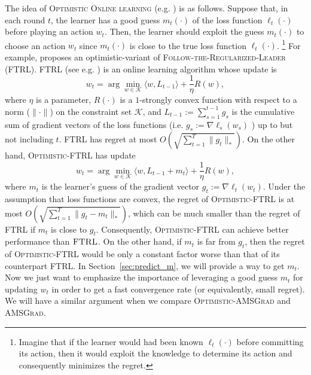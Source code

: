 \documentclass[11pt]{article}
\def\K{\mathcal{K}}
\theoremstyle{k}
\begin{document}
The idea of \textsc{Optimistic Online learning} (e.g. \cite{CJ12,RS13,SALS15,ALLW18})
is as follows.
Suppose that, in each round $t$, the learner has a good guess $m_t(\cdot)$ of the loss function $\ell_t(\cdot)$ before playing an action $w_t$. 
Then, the learner should exploit the guess $m_t(\cdot)$ to choose an action $w_t$ since $m_t(\cdot)$ is close to the true loss function $\ell_t(\cdot)$.
\footnote{Imagine that if the learner would had been known $\ell_t(\cdot)$ before committing its action, then it would exploit the knowledge to determine its action and consequently minimizes the regret.} For example, \cite{SALS15} proposes an optimistic-variant of \textsc{Follow-the-Regularized-Leader} (\textsc{FTRL}).
\textsc{FTRL} (see e.g. \cite{H14}) is an online learning algorithm whose update is
\begin{equation} \label{optFTRL}
\textstyle w_t  = \arg \min_{w \in \K} \langle w , L_{t-1} \rangle + \frac{1}{\eta} R(w),
\end{equation}
where $\eta$ is a parameter, $R(\cdot)$ is a $1$-strongly convex function with respect to a norm ($\| \cdot \|$) on the constraint set $\K$, and
$L_{t-1}:= \sum_{s=1}^{t-1} g_s$ is the cumulative sum of gradient vectors of 
the loss functions (i.e. $g_s := \nabla \ell_s(w_s)$ ) up to but not including $t$.
FTRL has regret at most $O(\sqrt{\sum_{t=1}^T \| g_t \|_*})$.
On the other hand, \textsc{Optimistic-FTRL} \cite{SALS15} has update  
\begin{equation} \label{optFTRL}
\textstyle w_t  = \arg \min_{w \in \K} \langle w , L_{t-1} + m_t \rangle + \frac{1}{\eta} R(w),
\end{equation}
where 
$m_{t}$ is the learner's guess of the gradient vector $g_{t}:=\nabla \ell_t(w_t)$.
Under the assumption that loss functions are convex,
the regret of \textsc{Optimistic-FTRL} is at most
$O(\sqrt{\sum_{t=1}^T \| g_t - m_t \|_*  } )$,
which can be much smaller than the regret of \textsc{FTRL} if $m_{t}$ is close to $g_{t}$.
Consequently, \textsc{Optimistic-FTRL} can achieve better performance than $\textsc{FTRL}$.
On the other hand, if $m_t$ is far from $g_t$, then 
the regret of \textsc{Optimistic-FTRL} would be only a constant factor worse than that of its counterpart \textsc{FTRL}. 
In Section~\ref{sec:predict_m}, we will provide a way to get $m_t$. Now we just want to emphasize the importance of leveraging a good guess $m_t$ for updating $w_t$ in order to get a fast convergence rate (or equivalently, small regret). We will have a similar argument when we compare \textsc{Optimistic-AMSGrad} and \textsc{AMSGrad}.
\end{document}
